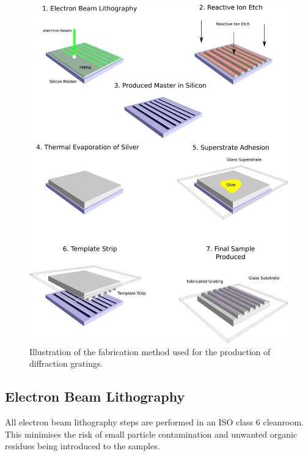 \begin{figure}
\includegraphics[width=\linewidth]{fabrication-diagram.pdf}
\caption{Illustration of the fabrication method used for the production of diffraction gratings. \label{fig:fabricationprocess}}
\end{figure}
 
\subsection{Electron Beam Lithography}

All electron beam lithography steps are performed in an ISO class 6 cleanroom. This minimises the risk of small particle contamination and unwanted organic residues being introduced to the samples.

